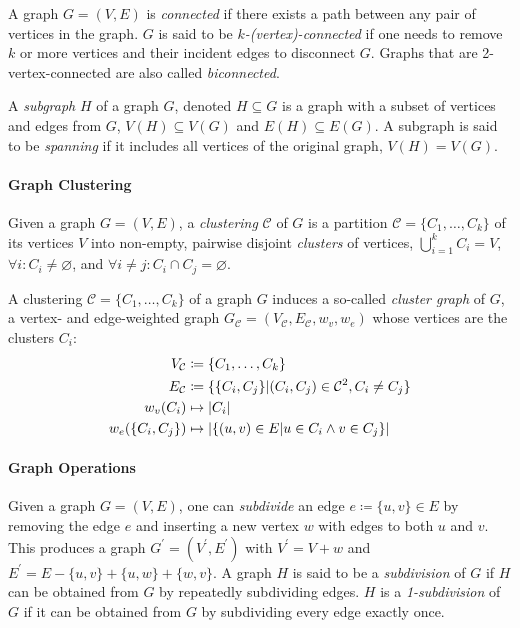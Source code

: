 A graph $G = (V, E)$ is \emph{connected} if there exists a path between any pair of vertices in the graph.
$G$ is said to be \emph{$k$-(vertex)-connected} if one needs to remove $k$ or more vertices and their incident edges to disconnect $G$.
Graphs that are 2-vertex-connected are also called \emph{biconnected}.

A \emph{subgraph} $H$ of a graph $G$, denoted $H \subseteq G$ is a graph with a subset of vertices and edges from $G$, \ie{} $V(H) \subseteq V(G)$ and $E(H) \subseteq E(G)$.
A subgraph is said to be \emph{spanning} if it includes all vertices of the original graph, \ie{} $V(H) = V(G)$.


\paragraph{Graph Clustering}

Given a graph $G = (V, E)$, a \emph{clustering} $\mathcal{C}$ of $G$ is a partition $\mathcal{C} = \{C_1, \dots, C_k\}$ of its vertices $V$ into non-empty, pairwise disjoint \emph{clusters} of vertices, \ie{} $\bigcup_{i=1}^k C_i = V$, $\forall i \colon C_i \neq \varnothing$, and $\forall i \neq j \colon C_i \cap C_j = \varnothing$.

A clustering $\mathcal{C} = \{ C_1, \dots, C_k \}$ of a graph $G$ induces a so-called \emph{cluster graph} of $G$, a vertex- and edge-weighted graph $G_\mathcal{C} = (V_\mathcal{C}, E_\mathcal{C}, w_v, w_e)$ whose vertices are the clusters $C_i$:
%
\begin{align*}
V_\mathcal{C} &\coloneqq \{ C_1, \dots, C_k \} \\
E_\mathcal{C} &\coloneqq \{ \{C_i, C_j\} \vert (C_i, C_j) \in \mathcal{C}^2, C_i \neq C_j \} \\
w_v(C_i) &\mapsto \left\lvert C_i\right\rvert \\
w_e(\{C_i, C_j\}) &\mapsto \left\lvert\{ (u,v) \in E \vert u \in C_i \land v \in C_j \}\right\rvert
\end{align*}



\paragraph{Graph Operations}


Given a graph $G = (V, E)$, one can \emph{subdivide} an edge $e \coloneqq \{u,v\} \in E$ by removing the edge $e$ and inserting a new vertex $w$ with edges to both $u$ and $v$.
This produces a graph $G^\prime = (V^\prime, E^\prime)$ with $V^\prime = V + w$ and $E^\prime = E - \{u,v\} + \{u,w\} + \{w,v\}$.
A graph $H$ is said to be a \emph{subdivision} of $G$ if $H$ can be obtained from $G$ by repeatedly subdividing edges.
$H$ is a \emph{1-subdivision} of $G$ if it can be obtained from $G$ by subdividing every edge exactly once.

